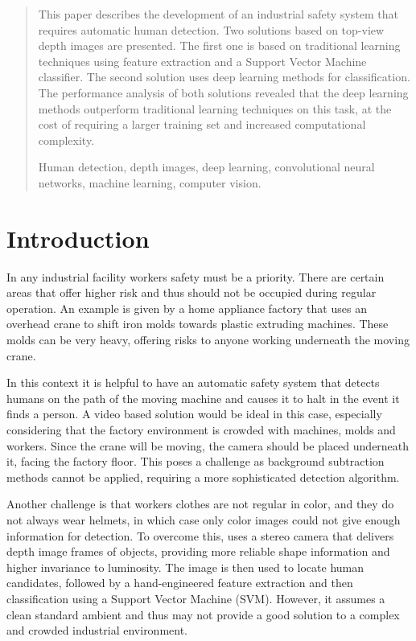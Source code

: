 \begin{abstract}
This paper describes the development of an industrial safety system that requires automatic human detection. Two solutions based on top-view depth images are presented. The first one is based on traditional learning techniques using feature extraction and a Support Vector Machine classifier. The second solution uses deep learning methods for classification. The performance analysis of both solutions revealed that the deep learning methods outperform traditional learning techniques on this task, at the cost of requiring a larger training set and increased computational complexity.
\begin{keywords}
  Human detection, depth images, deep learning, convolutional neural networks, machine learning, computer vision.
\end{keywords}
\end{abstract}

\section{Introduction}
  In any industrial facility workers safety must be a priority. There are certain areas that offer higher risk and thus should not be occupied during regular operation. An example is given by a home appliance factory that uses an overhead crane to shift iron molds towards plastic extruding machines. These molds can be very heavy, offering risks to anyone working underneath the moving crane.

  In this context it is helpful to have an automatic safety system that detects humans on the path of the moving machine and causes it to halt in the event it finds a person. A video based solution would be ideal in this case, especially considering that the factory environment is crowded with machines, molds and workers. Since the crane will be moving, the camera should be placed underneath it,  facing the factory floor. This poses a challenge as background subtraction methods cannot be applied, requiring a more sophisticated detection algorithm.

  Another challenge is that workers clothes are not regular in color, and they do not always wear helmets, in which case only color images could not give enough information for detection. To overcome this, \cite{rauter} uses a stereo camera that delivers depth image frames of objects, providing more reliable shape information and higher invariance to luminosity. The image is then used to locate human candidates, followed by a hand-engineered feature extraction and then classification using a Support Vector Machine (SVM). However, it assumes a clean standard ambient and thus may not provide a good solution to a complex and crowded industrial environment.

